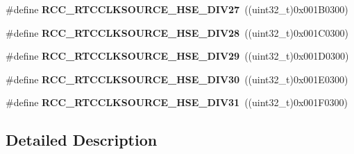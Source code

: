 \begin{DoxyCompactItemize}
\item 
\#define {\bfseries R\+C\+C\+\_\+\+R\+T\+C\+C\+L\+K\+S\+O\+U\+R\+C\+E\+\_\+\+H\+S\+E\+\_\+\+D\+I\+V27}~((uint32\+\_\+t)0x001\+B0300)\hypertarget{group___r_c_c___r_t_c___clock___source_ga65afd29f069e2e9b607212876d7860e5}{}\label{group___r_c_c___r_t_c___clock___source_ga65afd29f069e2e9b607212876d7860e5}

\item 
\#define {\bfseries R\+C\+C\+\_\+\+R\+T\+C\+C\+L\+K\+S\+O\+U\+R\+C\+E\+\_\+\+H\+S\+E\+\_\+\+D\+I\+V28}~((uint32\+\_\+t)0x001\+C0300)\hypertarget{group___r_c_c___r_t_c___clock___source_ga28e7a9291c903b820991c3a3e80c9ae1}{}\label{group___r_c_c___r_t_c___clock___source_ga28e7a9291c903b820991c3a3e80c9ae1}

\item 
\#define {\bfseries R\+C\+C\+\_\+\+R\+T\+C\+C\+L\+K\+S\+O\+U\+R\+C\+E\+\_\+\+H\+S\+E\+\_\+\+D\+I\+V29}~((uint32\+\_\+t)0x001\+D0300)\hypertarget{group___r_c_c___r_t_c___clock___source_gac22536498ea83e12ecd83f04d5e98858}{}\label{group___r_c_c___r_t_c___clock___source_gac22536498ea83e12ecd83f04d5e98858}

\item 
\#define {\bfseries R\+C\+C\+\_\+\+R\+T\+C\+C\+L\+K\+S\+O\+U\+R\+C\+E\+\_\+\+H\+S\+E\+\_\+\+D\+I\+V30}~((uint32\+\_\+t)0x001\+E0300)\hypertarget{group___r_c_c___r_t_c___clock___source_ga5849760bab0f4057bd254cd022dc1a7a}{}\label{group___r_c_c___r_t_c___clock___source_ga5849760bab0f4057bd254cd022dc1a7a}

\item 
\#define {\bfseries R\+C\+C\+\_\+\+R\+T\+C\+C\+L\+K\+S\+O\+U\+R\+C\+E\+\_\+\+H\+S\+E\+\_\+\+D\+I\+V31}~((uint32\+\_\+t)0x001\+F0300)\hypertarget{group___r_c_c___r_t_c___clock___source_ga074ac97804136221e39f50eb4cf13e3a}{}\label{group___r_c_c___r_t_c___clock___source_ga074ac97804136221e39f50eb4cf13e3a}

\end{DoxyCompactItemize}


\subsection{Detailed Description}
